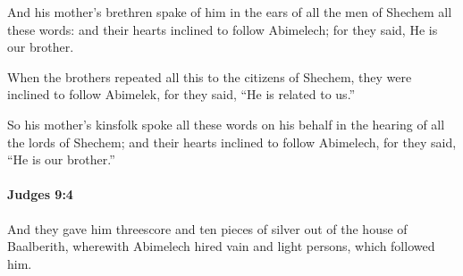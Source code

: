 			\begin{versebox}
					\item[BHS] 
					\item[ASV] And his mother's brethren spake of him in the ears of all the men of Shechem all these words: and their hearts inclined to follow Abimelech; for they said, He is our brother.
					\item[NIV] When the brothers repeated all this to the citizens of Shechem, they were inclined to follow Abimelek, for they said, “He is related to us.”
					\item[NRSV] So his mother’s kinsfolk spoke all these words on his behalf in the hearing of all the lords of Shechem; and their hearts inclined to follow Abimelech, for they said, “He is our brother.”
			\end{versebox}

		\paragraph{Judges 9:4} %
			\label{JUDGES-9-4}

			And they gave him threescore and ten pieces of silver out of the house of Baalberith, wherewith Abimelech hired vain and light persons, which followed him.

